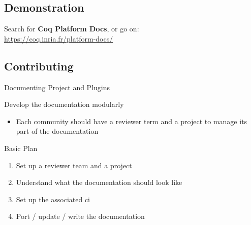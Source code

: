 \documentclass[10pt]{beamer}
\begin{document}
\subsection{Demonstration}


\begin{frame}
  \begin{center}
    \large
    Search for \textbf{Coq Platform Docs}, or go on: \\
    \textcolor{blue}{\url{https://coq.inria.fr/platform-docs/}}
  \end{center}
\end{frame}


\subsection{Contributing}


\begin{frame}{Documenting Project and Plugins}
  \begin{tcbProp}{Develop the documentation modularly}
    \begin{itemize}
      \item Each community should have a reviewer term and a project to manage
            its part of the documentation
    \end{itemize}
  \end{tcbProp}
  \begin{tcbProp}{Basic Plan}
    \begin{enumerate}
      \item Set up a reviewer team and a project
      \item Understand what the documentation should look like
      \item Set up the associated ci
      \item Port / update / write the documentation
    \end{enumerate}
  \end{tcbProp}
\end{frame}
\end{document}
